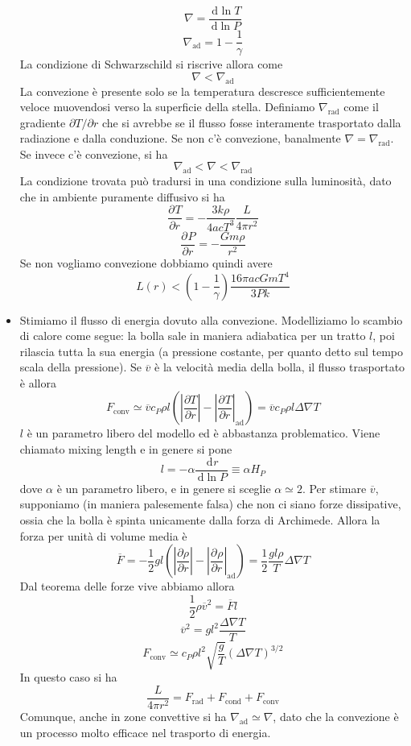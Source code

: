 \documentclass[a4paper,11pt]{article}
\renewcommand{\d}{\mathrm{d}} %
\newcommand{\der}[3][]{\frac{\d ^{#1}#2}{\d {#3}^{#1}}} %
\newcommand{\pder}[3][]{\frac{\partial ^{#1}#2}{\partial {#3}^{#1}}} %
\let\oldnabla\nabla %
\renewcommand{\nabla}{\vec{\oldnabla}} %
\renewcommand{\d}{\,\mathrm{d}}
\theoremstyle{theorem}
\theoremstyle{definition}
\begin{document}
\begin{itemize}
		\[\oldnabla=\der{\ln T}{\ln P}\]
		\[\oldnabla_\textrm{ad}=1-\frac{1}{\gamma}\]
		La condizione di Schwarzschild si riscrive allora come
		\[\oldnabla<\oldnabla_\textrm{ad}\]
		La convezione è presente solo se la temperatura descresce sufficientemente veloce muovendosi verso la superficie della stella. Definiamo $\oldnabla_\textrm{rad}$ come il gradiente $\partial T/\partial r$ che si avrebbe se il flusso fosse interamente trasportato dalla radiazione e dalla conduzione. Se non c'è convezione, banalmente $\oldnabla=\oldnabla_\textrm{rad}$. Se invece c'è convezione, si ha
		\[\oldnabla_\textrm{ad}<\oldnabla<\oldnabla_\textrm{rad}\]
		La condizione trovata può tradursi in una condizione sulla luminosità, dato che in ambiente puramente diffusivo si ha
		\[\pder{T}{r}=-\frac{3k\rho}{4acT^3}\frac{L}{4\pi r^2}\]
		\[\pder{P}{r}=-\frac{Gm\rho}{r^2}\]
		Se non vogliamo convezione dobbiamo quindi avere
		\[L(r)<\left(1-\frac{1}{\gamma}\right)\frac{16\pi acGmT^4}{3Pk}\]
		\item Stimiamo il flusso di energia dovuto alla convezione. Modelliziamo lo scambio di calore come segue: la bolla sale in maniera adiabatica per un tratto $l$, poi rilascia tutta la sua energia (a pressione costante, per quanto detto sul tempo scala della pressione). Se $\overline{v}$ è la velocità media della bolla, il flusso trasportato è allora
		\[F_\textrm{conv}\simeq\overline{v}c_P\rho l\left(\left|\frac{\partial T}{\partial r}\right|-\left|\pder{T}{r}\right|_\textrm{ad}\right)=\overline{v}c_P\rho l\Delta\oldnabla T\]
		$l$ è un parametro libero del modello ed è abbastanza problematico. Viene chiamato mixing length e in genere si pone
		\[l=-\alpha\der{r}{\ln P}\equiv\alpha H_P\]
		dove $\alpha$ è un parametro libero, e in genere si sceglie $\alpha\simeq 2$. Per stimare $\overline{v}$, supponiamo (in maniera palesemente falsa) che non ci siano forze dissipative, ossia che la bolla è spinta unicamente dalla forza di Archimede. Allora la forza per unità di volume media è
		\[\overline{F}=-\frac{1}{2}gl\left(\left|\frac{\partial \rho}{\partial r}\right|-\left|\pder{\rho}{r}\right|_\textrm{ad}\right)=\frac{1}{2}\frac{gl\rho}{T}\Delta\oldnabla T\]
		Dal teorema delle forze vive abbiamo allora
		\[\frac{1}{2}\rho\overline{v}^2=\overline{F}l\]
		\[\overline{v}^2=gl^2\frac{\Delta\oldnabla T}{T}\]
		\[F_{\textrm{conv}}\simeq c_P\rho l^2\sqrt{\frac{g}{T}}\left(\Delta\oldnabla T\right)^{3/2}\]
		In questo caso si ha
		\[\frac{L}{4\pi r^2}=F_\textrm{rad}+F_\textrm{cond}+F_\textrm{conv}\]
		Comunque, anche in zone convettive si ha $\oldnabla_\textrm{ad}\simeq\oldnabla$, dato che la convezione è un processo molto efficace nel trasporto di energia.

\end{itemize}
\end{document}
